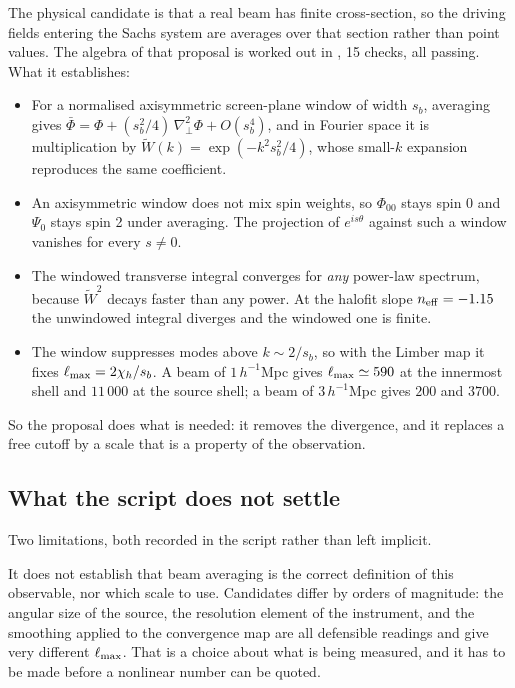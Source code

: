 The physical candidate is that a real beam has finite cross-section, so the
driving fields entering the Sachs system are averages over that section
rather than point values. The algebra of that proposal is worked out in
,
15 checks, all passing. What it establishes:

\begin{itemize}
\item For a normalised axisymmetric screen-plane window of width $s_b$,
averaging gives
$\bar\Phi = \Phi + (s_b^2/4)\,\nabla^2_\perp\Phi + O(s_b^4)$, and in Fourier
space it is multiplication by $\tilde W(k)=\exp(-k^2s_b^2/4)$, whose
small-$k$ expansion reproduces the same coefficient.
\item An axisymmetric window does not mix spin weights, so $\Phi_{00}$ stays
spin 0 and $\Psi_0$ stays spin 2 under averaging. The projection of
$e^{is\theta}$ against such a window vanishes for every $s\ne0$.
\item The windowed transverse integral converges for \emph{any} power-law
spectrum, because $\tilde W^2$ decays faster than any power. At the halofit
slope $n_{\rm eff}=-1.15$ the unwindowed integral diverges and the windowed
one is finite.
\item The window suppresses modes above $k\sim2/s_b$, so with the Limber map
it fixes $\ell_{\max} = 2\chi_h/s_b$. A beam of $1\,h^{-1}$Mpc gives
$\ell_{\max}\simeq590$ at the innermost shell and $11\,000$ at the source shell;
a beam of $3\,h^{-1}$Mpc gives $200$ and $3700$.
\end{itemize}

So the proposal does what is needed: it removes the divergence, and it
replaces a free cutoff by a scale that is a property of the observation.

\subsection{What the script does not settle}

Two limitations, both recorded in the script rather than left implicit.

It does not establish that beam averaging is the correct definition of this
observable, nor which scale to use. Candidates differ by orders of
magnitude: the angular size of the source, the resolution element of the
instrument, and the smoothing applied to the convergence map are all
defensible readings and give very different $\ell_{\max}$. That is a choice
about what is being measured, and it has to be made before a nonlinear
number can be quoted.

